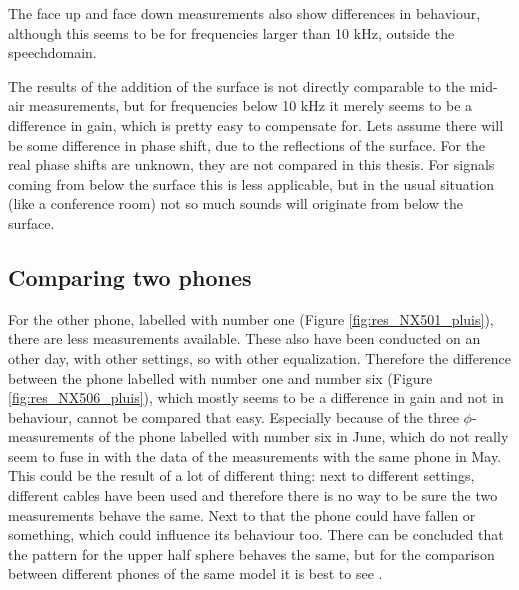 The face up and face down measurements also show differences in behaviour, although this seems to be for frequencies larger than 10 kHz, outside the speechdomain.

The results of the addition of the surface is not directly comparable to the mid-air measurements, but for frequencies below 10 kHz it merely seems to be a difference in gain, which is pretty easy to compensate for.
Lets assume there will be some difference in phase shift, due to the reflections of the surface.
For the real phase shifts are unknown, they are not compared in this thesis.
For signals coming from below the surface this is less applicable, but in the usual situation (like a conference room) not so much sounds will originate from below the surface.

\subsection{Comparing two phones}
\label{sec:comparing_two}
For the other phone, labelled with number one (Figure \ref{fig:res_NX501_pluis}), there are less measurements available.
These also have been conducted on an other day, with other settings, so with other equalization.
Therefore the difference between the phone labelled with number one and number six (Figure \ref{fig:res_NX506_pluis}), which mostly seems to be a difference in gain and not in behaviour, cannot be compared that easy.
Especially because of the three $\phi$-measurements of the phone labelled with number six in June, which do not really seem to fuse in with the data of the measurements with the same phone in May.
This could be the result of a lot of different thing: next to different settings, different cables have been used and therefore there is no way to be sure the two measurements behave the same.
Next to that the phone could have fallen or something, which could influence its behaviour too.
There can be concluded that the pattern for the upper half sphere behaves the same, but for the comparison between different phones of the same model it is best to see \cite{Gaubitch2014}.